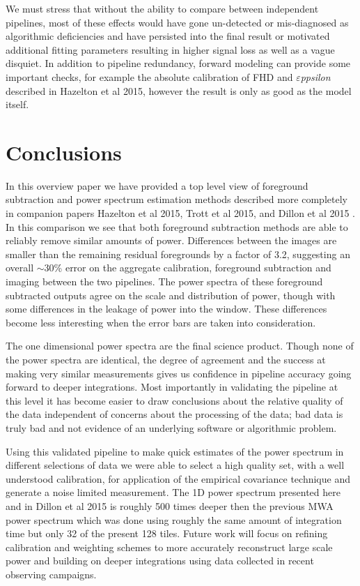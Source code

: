 \documentclass[twolcolumn,iop]{emulateapj}
\def\eppsilon{{\it $\varepsilon$ppsilon}}
\def\chipscite{Trott et al 2015}
\def\eppsiloncite{Hazelton et al 2015}
\def\dilloncite{Dillon et al 2015 }
\begin{document}
  We must stress that without the ability to compare between independent pipelines, most of these effects would have gone un-detected or mis-diagnosed as algorithmic deficiencies and have persisted into the final result or motivated additional fitting parameters resulting in higher signal loss as well as a vague disquiet. In addition to pipeline redundancy, forward modeling can provide some important checks, for example the absolute calibration of FHD and \eppsilon{} described in \eppsiloncite{}, however the result is only as good as the model itself.
  
\section{Conclusions}
\label{sec:conclusion}
In this overview paper we have provided a top level view of foreground subtraction and power spectrum estimation methods described more completely in companion papers \eppsiloncite{}, \chipscite{}, and \dilloncite{}.  In this comparison we see that both foreground subtraction methods are able to reliably remove similar amounts of power.  Differences between the images are smaller than the remaining residual foregrounds by a factor of 3.2, suggesting an overall $\sim$30\% error on the aggregate calibration, foreground subtraction and imaging between the two pipelines.  The power spectra of these foreground subtracted outputs agree on the scale and distribution of power, though with some differences in the leakage of power into the window. These differences become less interesting when the error bars are taken into consideration.    


The one dimensional power spectra are the final science product. Though none of the power spectra are identical, the degree of agreement and the success at making very similar measurements gives us confidence in pipeline accuracy going forward to deeper integrations. Most importantly in validating the pipeline at this level it has become easier to draw conclusions about the relative quality of the data independent of concerns about the processing of the data; bad data is truly bad and not evidence of an underlying software or algorithmic problem.  

Using this validated pipeline to make quick estimates of the power spectrum in different selections of data we were able to select a high quality set, with a well understood calibration, for application of the empirical  covariance technique and generate a noise limited measurement.  The 1D power spectrum presented here and in \dilloncite{} is roughly 500 times deeper then the previous MWA power spectrum \citep{Dillon:2014p9788} which was done using roughly the same amount of integration time but only 32 of the present 128 tiles.  Future work will focus on refining calibration and weighting schemes to more accurately reconstruct large scale power and building on deeper integrations using data collected in recent observing campaigns.
\end{document}
